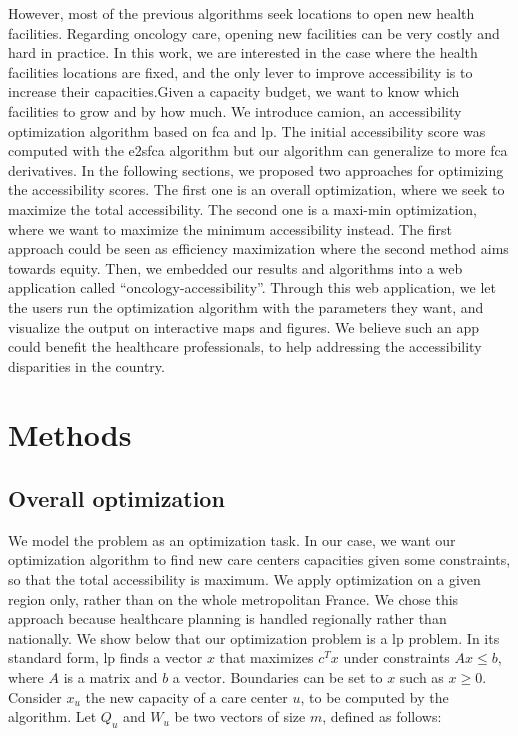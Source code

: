 However, most of the previous algorithms seek locations to open new health
facilities. Regarding oncology care, opening new facilities can be very costly
and hard in practice. In this work, we are interested in the case where the
health facilities locations are fixed, and the only lever to improve
accessibility is to increase their capacities.Given a capacity budget, we want
to know which facilities to grow and by how much. We introduce \ac{camion}, an
accessibility optimization algorithm based on \ac{fca} and \ac{lp}. The initial
accessibility score was computed with the \ac{e2sfca} algorithm
\cite{luo_enhanced_2009} but our algorithm can generalize to more \ac{fca}
derivatives. In the following sections, we proposed two approaches for
optimizing the accessibility scores. The first one is an overall optimization,
where we seek to maximize the total accessibility. The second one is a maxi-min
optimization, where we want to maximize the minimum accessibility instead. The
first approach could be seen as efficiency maximization where the second method
aims towards equity. Then, we embedded our results and algorithms into a
web application  called ``oncology-accessibility''. Through this web
application, we let the users run the optimization algorithm with the
parameters they want, and visualize the output on interactive maps and
figures. We believe such an app could benefit the healthcare professionals,
to help addressing the accessibility disparities in the country.

\section{Methods}

\subsection{Overall optimization}

We model the problem as an optimization task. In our case, we want our
optimization algorithm to find new care centers capacities given some
constraints, so that the total accessibility is maximum. We apply optimization
on a given region only, rather than on the whole metropolitan France. We chose
this approach because healthcare planning is handled regionally rather than
nationally. We show below that our optimization problem is a \acf{lp} problem. In
its standard form, \ac{lp} finds a vector $x$ that maximizes $c^T x$ under
constraints $Ax \leq b$, where $A$ is a matrix and $b$ a vector. Boundaries can
be set to $x$ such as $x \geq 0$. Consider $x_u$ the new capacity of a care
center $u$, to be computed by the algorithm. Let $Q_u$ and $W_u$ be two vectors
of size $m$, defined as follows:

